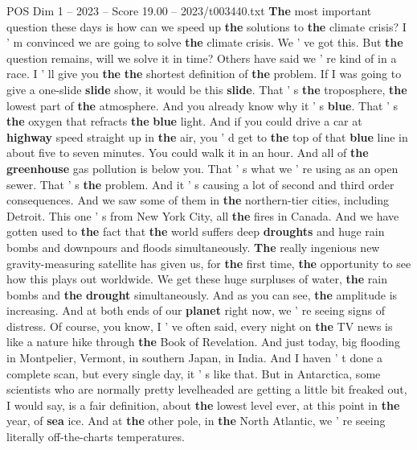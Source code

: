 \begin{textsample}{POS Dim 1 – 2023 – Score 19.00 – 2023/t003440.txt}  \label{ex:f1_pos_064}
\textbf{The} most important question these days is how can we speed up \textbf{the} solutions to \textbf{the} climate crisis?
I ' m convinced we are going to solve \textbf{the} climate crisis.
We ' ve got this.
But \textbf{the} question remains, will we solve it in time?
Others have said we ' re kind of in a race.
I ' ll give you \textbf{the} \textbf{the} shortest definition of \textbf{the} problem.
If I was going to give a one-slide \textbf{slide} show, it would be this \textbf{slide}.
That ' s \textbf{the} troposphere, \textbf{the} lowest part of \textbf{the} atmosphere.
And you already know why it ' s \textbf{blue}.
That ' s \textbf{the} oxygen that refracts \textbf{the} \textbf{blue} light.
And if you could drive a car at \textbf{highway} speed straight up in \textbf{the} air, you ' d get to \textbf{the} top of that \textbf{blue} line in about five to seven minutes.
You could walk it in an hour.
And all of \textbf{the} \textbf{greenhouse} gas pollution is below you.
That ' s what we ' re using as an open sewer.
That ' s \textbf{the} problem.
And it ' s causing a lot of second and third order consequences.
And we saw some of them in \textbf{the} northern-tier cities, including Detroit.
This one ' s from New York City, all \textbf{the} fires in Canada.
And we have gotten used to \textbf{the} fact that \textbf{the} world suffers deep \textbf{droughts} and huge rain bombs and downpours and floods simultaneously. \textbf{The} really ingenious new gravity-measuring satellite has given us, for \textbf{the} first time, \textbf{the} opportunity to see how this plays out worldwide.
We get these huge surpluses of water, \textbf{the} rain bombs and \textbf{the} \textbf{drought} simultaneously.
And as you can see, \textbf{the} amplitude is increasing.
And at both ends of our \textbf{planet} right now, we ' re seeing signs of distress.
Of course, you know, I ' ve often said, every night on \textbf{the} TV news is like a nature hike through \textbf{the} Book of Revelation.
And just today, big flooding in Montpelier, Vermont, in southern Japan, in India.
And I haven ' t done a complete scan, but every single day, it ' s like that.
But in Antarctica, some scientists who are normally pretty levelheaded are getting a little bit freaked out, I would say, is a fair definition, about \textbf{the} lowest level ever, at this point in \textbf{the} year, of \textbf{sea} ice.
And at \textbf{the} other pole, in \textbf{the} North Atlantic, we ' re seeing literally off-the-charts temperatures.

\end{textsample}
